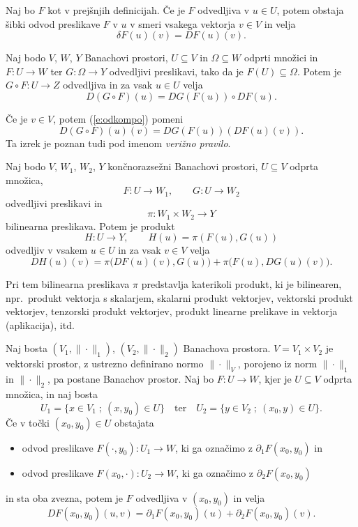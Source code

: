 \begin{trditev}
	Naj bo $F$ kot v prejšnjih definicijah. Če je $F$ odvedljiva v $u\in U$,
	potem obstaja šibki odvod preslikave $F$ v $u$ v smeri vsakega vektorja $v\in V$
	in velja
	\[
		\delta F(u)(v)=DF(u)(v).
	\]
\end{trditev}

\begin{izrek}
	Naj bodo $V$, $W$, $Y$ Banachovi prostori, $U\subseteq V$ in $\Omega\subseteq W$ odprti
	množici in $F\colon U\to W$ ter $G\colon\Omega\to Y$ odvedljivi preslikavi,
	tako da je $F(U)\subseteq\Omega$.
	Potem je $G\circ F\colon U\to Z$ odvedljiva in za vsak $u\in U$ velja
	\begin{equation} \label{e:odkompo}
		D(G\circ F)(u)=DG(F(u))\circ DF(u).
	\end{equation}
\end{izrek}
Če je $v\in V$, potem (\ref{e:odkompo}) pomeni
\[
	D(G\circ F)(u)(v)=DG(F(u))(DF(u)(v)).
\]
Ta izrek je poznan tudi pod imenom \emph{verižno pravilo}.

\begin{izrek}
	Naj bodo $V$, $W_1$, $W_2$, $Y$ \textcolor[rgb]{1,0,0}{končnorazsežni} Banachovi prostori,
	$U\subseteq V$ odprta množica,
	\[
		F\colon U\to W_1,\qquad G\colon U\to W_2
	\]
	odvedljivi preslikavi in
	\[ \pi\colon W_1\times W_2\to Y \]
	bilinearna preslikava. Potem je produkt
	\[
		H\colon U\to Y, \qquad H(u)=\pi(F(u),G(u))
	\]
	odvedljiv v vsakem $u\in U$ in za vsak $v\in V$ velja
	\[
		DH(u)(v)=\pi\big(DF(u)(v),G(u)\big)+\pi\big(F(u),DG(u)(v)\big).
	\]
\end{izrek}
Pri tem bilinearna preslikava $\pi$ predstavlja katerikoli produkt, ki je bilinearen,
npr.~produkt vektorja s skalarjem, skalarni produkt vektorjev, vektorski produkt vektorjev,
tenzorski produkt vektorjev, produkt linearne prelikave in vektorja (aplikacija), itd.

Naj bosta $(V_1,\|\cdot\|_1)$, $(V_2,\|\cdot\|_2)$ Banachova prostora. $V=V_1\times V_2$
je vektorski prostor, z ustrezno definirano normo $\|\cdot\|_V$, porojeno iz norm $\|\cdot\|_1$ in $\|\cdot\|_2$,
pa postane Banachov prostor. Naj bo $F\colon U\to W$, kjer je $U\subseteq V$ odprta množica, in naj bosta
\[ U_1=\{x\in V_1\;;\ (x,y_0)\in U\}\quad\textrm{ter}\quad U_2=\{y\in V_2\;;\ (x_0,y)\in U\}. \]
Če v točki $(x_0,y_0)\in U$ obstajata
\begin{itemize}
\item odvod preslikave $F(\cdot,y_0)\colon U_1\to W$, ki ga označimo z $\partial_1 F(x_0,y_0)$ in
\item odvod preslikave $F(x_0,\cdot)\colon U_2\to W$, ki ga označimo z $\partial_2 F(x_0,y_0)$
\end{itemize}
in sta oba zvezna, potem je $F$ odvedljiva v $(x_0,y_0)$ in velja
\[ DF(x_0,y_0)(u,v)=\partial_1 F(x_0,y_0)(u)+\partial_2 F(x_0,y_0)(v). \]



